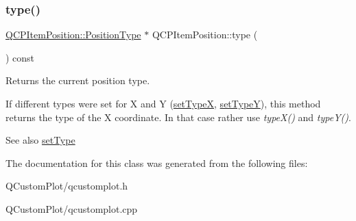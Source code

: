 \mbox{\label{class_q_c_p_item_position_abfd74d86bd799306ce0295ffe433bdfc}} 
\subsubsection{\texorpdfstring{type()}{type()}}
{\footnotesize\ttfamily \mbox{\hyperlink{class_q_c_p_item_position_aad9936c22bf43e3d358552f6e86dbdc8}{Q\+C\+P\+Item\+Position\+::\+Position\+Type}} $\ast$ Q\+C\+P\+Item\+Position\+::type (\begin{DoxyParamCaption}{ }\end{DoxyParamCaption}) const\hspace{0.3cm}{\ttfamily [inline]}}

Returns the current position type.

If different types were set for X and Y (\mbox{\hyperlink{class_q_c_p_item_position_a2113b2351d6d00457fb3559a4e20c3ea}{set\+TypeX}}, \mbox{\hyperlink{class_q_c_p_item_position_ac2a454aa5a54c1615c50686601ec4510}{set\+TypeY}}), this method returns the type of the X coordinate. In that case rather use {\itshape type\+X()} and {\itshape type\+Y()}.

\begin{DoxySeeAlso}{See also}
\mbox{\hyperlink{class_q_c_p_item_position_aa476abf71ed8fa4c537457ebb1a754ad}{set\+Type}} 
\end{DoxySeeAlso}


The documentation for this class was generated from the following files\+:\begin{DoxyCompactItemize}
\item 
Q\+Custom\+Plot/qcustomplot.\+h\item 
Q\+Custom\+Plot/qcustomplot.\+cpp\end{DoxyCompactItemize}
